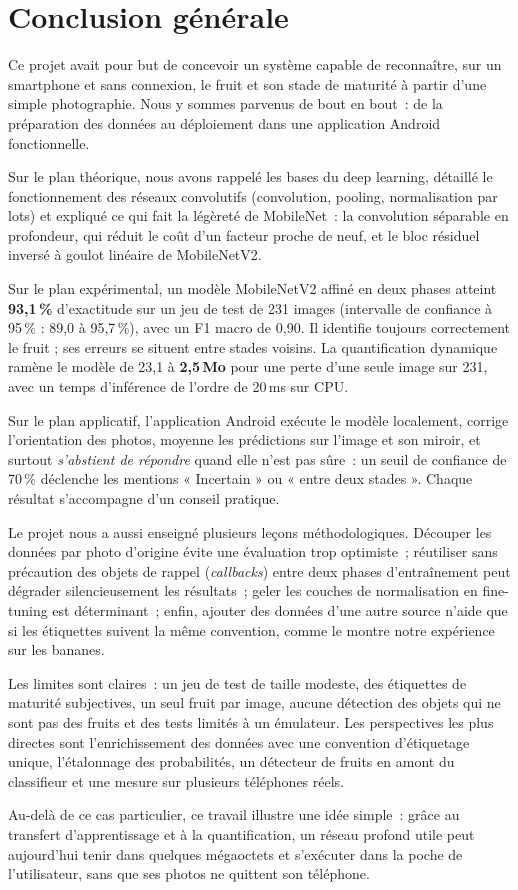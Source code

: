 \chapter*{Conclusion générale}
\thispagestyle{plain}

Ce projet avait pour but de concevoir un système capable de reconnaître, sur un smartphone et sans connexion, le fruit et son stade de maturité à partir d’une simple photographie. Nous y sommes parvenus de bout en bout~: de la préparation des données au déploiement dans une application Android fonctionnelle.

Sur le plan théorique, nous avons rappelé les bases du deep learning, détaillé le fonctionnement des réseaux convolutifs (convolution, pooling, normalisation par lots) et expliqué ce qui fait la légèreté de MobileNet~: la convolution séparable en profondeur, qui réduit le coût d’un facteur proche de neuf, et le bloc résiduel inversé à goulot linéaire de MobileNetV2.

Sur le plan expérimental, un modèle MobileNetV2 affiné en deux phases atteint \textbf{93,1\,\%} d’exactitude sur un jeu de test de 231 images (intervalle de confiance à 95\,\% : 89,0 à 95,7\,\%), avec un F1 macro de 0,90. Il identifie toujours correctement le fruit ; ses erreurs se situent entre stades voisins. La quantification dynamique ramène le modèle de 23,1 à \textbf{2,5\,Mo} pour une perte d’une seule image sur 231, avec un temps d’inférence de l’ordre de 20\,ms sur CPU.

Sur le plan applicatif, l’application Android exécute le modèle localement, corrige l’orientation des photos, moyenne les prédictions sur l’image et son miroir, et surtout \emph{s’abstient de répondre} quand elle n’est pas sûre~: un seuil de confiance de 70\,\% déclenche les mentions « Incertain » ou « entre deux stades ». Chaque résultat s’accompagne d’un conseil pratique.

Le projet nous a aussi enseigné plusieurs leçons méthodologiques. Découper les données par photo d’origine évite une évaluation trop optimiste~; réutiliser sans précaution des objets de rappel (\emph{callbacks}) entre deux phases d’entraînement peut dégrader silencieusement les résultats~; geler les couches de normalisation en fine-tuning est déterminant~; enfin, ajouter des données d’une autre source n’aide que si les étiquettes suivent la même convention, comme le montre notre expérience sur les bananes.

Les limites sont claires~: un jeu de test de taille modeste, des étiquettes de maturité subjectives, un seul fruit par image, aucune détection des objets qui ne sont pas des fruits et des tests limités à un émulateur. Les perspectives les plus directes sont l’enrichissement des données avec une convention d’étiquetage unique, l’étalonnage des probabilités, un détecteur de fruits en amont du classifieur et une mesure sur plusieurs téléphones réels.

Au-delà de ce cas particulier, ce travail illustre une idée simple~: grâce au transfert d’apprentissage et à la quantification, un réseau profond utile peut aujourd’hui tenir dans quelques mégaoctets et s’exécuter dans la poche de l’utilisateur, sans que ses photos ne quittent son téléphone.
